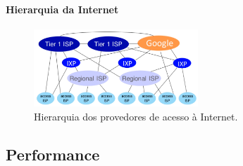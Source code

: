     \paragraph{Hierarquia da Internet}
    \begin{figure}[H]
        \centering
        \includegraphics[width=0.55\textwidth]{img/cap-01/hierarquia.png}
        \caption{Hierarquia dos provedores de acesso à Internet.}
    \end{figure}

   \subsection{Performance}

